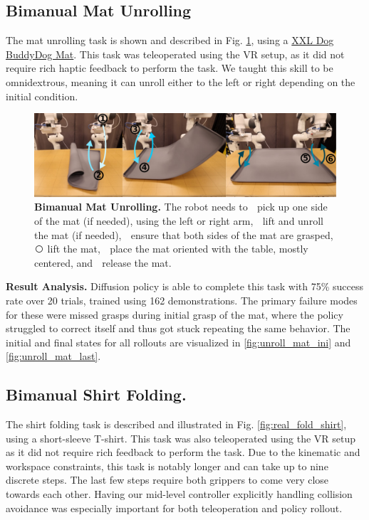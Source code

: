 \subsection{Bimanual Mat Unrolling}

The mat unrolling task is shown and described in Fig. \ref{fig:real_unroll_mat}, using a
\href{https://www.amazon.com/DogBuddy-Dog-Food-Mat-Waterproof/dp/B08GGDNB71}{XXL Dog Buddy\legalTM Dog Mat}.
This task was teleoperated using the VR setup, as it did not require rich haptic feedback to perform the task. We taught this skill to be omnidextrous, meaning it can unroll either to the left or right depending on the initial condition.

\begin{figure}[t]
\centering
\includegraphics[width=\linewidth]{figure/real_unroll_mat_setup_compressed.pdf}
\caption{\textbf{Bimanual Mat Unrolling. } 
\label{fig:real_unroll_mat}
The robot needs to
\textcircled{} pick up one side of the mat (if needed), using the left or right arm,
\textcircled{} lift and unroll the mat (if needed),
\textcircled{} ensure that both sides of the mat are grasped,
\textcircled{} lift the mat,
\textcircled{} place the mat oriented with the table, mostly centered, and
\textcircled{} release the mat.
}
\vspace{-4mm}
\end{figure}

\textbf{Result Analysis.} Diffusion policy is able to complete this task with 75\% success rate over 20 trials, trained using 162 demonstrations. The primary failure modes for these were missed grasps during initial grasp of the mat, where the policy struggled to correct itself and thus got stuck repeating the same behavior. The initial and final states for all rollouts are visualized in \ref{fig:unroll_mat_ini} and \ref{fig:unroll_mat_last}.

\subsection{Bimanual Shirt Folding.}
The shirt folding task is described and illustrated in Fig. \ref{fig:real_fold_shirt}, using a short-sleeve T-shirt. This task was also teleoperated using the VR setup as it did not require rich
feedback to perform the task. Due to the kinematic and workspace constraints, this task is notably longer and can take up to nine discrete steps. The last few steps require both grippers to come very close towards each other. Having our mid-level controller explicitly handling collision avoidance was especially important for both teleoperation and policy rollout. 

